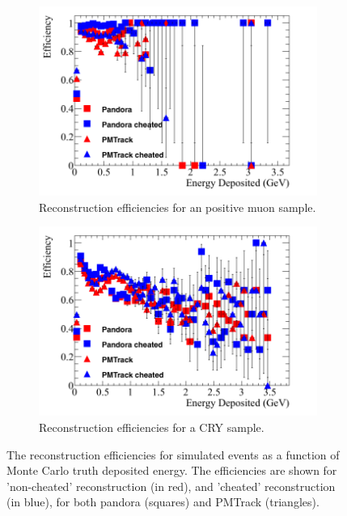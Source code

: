 \begin{figure}[h!]
  \centering
  \begin{subfigure}{0.48\textwidth}
    \centering
    \includegraphics[width=\textwidth]{Effic_AntiMuon_500V_All_EnDepos}
    \caption{Reconstruction efficiencies for an positive muon sample.}
    \label{fig:SimEffic_EnDepos_AMu}
  \end{subfigure}%
  \hspace{0.03\textwidth}%
  \begin{subfigure}{0.48\textwidth}
    \centering
    \includegraphics[width=\textwidth]{Effic_Cosmics_500V_All_EnDepos}
    \caption{Reconstruction efficiencies for a CRY sample.}
    \label{fig:SimEffic_EnDepos_CRY}
  \end{subfigure}
  \caption[The reconstruction efficiencies for simulated events as a function of Monte Carlo truth deposited energy.]
          {The reconstruction efficiencies for simulated events as a function of Monte Carlo truth deposited energy. The efficiencies are shown for 'non-cheated' reconstruction (in red), and 'cheated' reconstruction (in blue), for both pandora (squares) and PMTrack (triangles).}
          \label{fig:SimEffic_EnDepos}
\end{figure}


